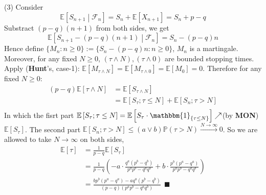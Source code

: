 \documentclass[a4paper,12pt,twoside]{book}
\begin{document}
\begin{itemize}
\begin{itemize}
	(3) Consider
	\begin{equation}
		\mathbb{E}\left[S_{n+1}\middle|\mathcal{F}_n\right] = S_n + \mathbb{E}\left[X_{n+1}\right] = S_n + p - q
	\end{equation}
	Substract $(p-q)(n+1)$ from both sides, we get
	\begin{equation}
		\mathbb{E}\left[S_{n+1}-(p-q)(n+1)\middle|\mathcal{F}_n\right] = S_n - (p-q)n
	\end{equation}
	Hence define $\{M_n: n\geq 0\}:=\{S_n-(p-q)n: n\geq 0\}$, $M_n$ is a martingale. \newline
	Moreover, for any fixed $N\geq 0$, $(\tau \wedge N), (\tau \wedge 0)$ are bounded stopping times. Apply (\textbf{Hunt}'s, case-1): $\mathbb{E}\left[M_{\tau \wedge N}\right]=\mathbb{E}\left[M_{\tau \wedge 0}\right]=\mathbb{E}\left[M_0\right]=0$. Therefore for any fixed $N\geq 0$:
	\begin{equation}
		\begin{split}
			(p-q)\mathbb{E}\left[\tau \wedge N\right] &= \mathbb{E}\left[S_{\tau \wedge N}\right]\\
			&= \mathbb{E}\left[S_{\tau}; \tau \leq N\right] + \mathbb{E}\left[S_n; \tau>N \right]\\
		\end{split}
	\end{equation}
	In which the fisrt part $\mathbb{E}\left[S_{\tau}; \tau \leq N\right] = \mathbb{E}\left[S_{\tau}\cdot \mathbbm{1}_{\{\tau\leq N\}}\right]\nearrow$(by \textbf{MON}) $\mathbb{E}\left[S_{\tau}\right]$. \newline
	The second part $\mathbb{E}\left[S_n; \tau>N\right]\leq (a \vee b)\mathbb{P}\left(\tau>N\right)\xrightarrow{N\to \infty}0$. \newline
	So we are allowed to take $N\to \infty$ on both sides, 
	\begin{equation}
		\begin{split}
			\mathbb{E}\left[\tau \right] &= \frac{1}{p-q}\mathbb{E}\left[S_{\tau}\right]\\
			&= \frac{1}{p-q}\left(-a\cdot  \frac{q^a(p^b-q^b)}{p^ap^b - q^a q^b}+b\cdot  \frac{p^b(p^a-q^a)}{p^ap^b - q^a q^b}\right)\\
			&= \frac{bp^b(p^a-q^a)-aq^a(p^b-q^b)}{(p-q)(p^ap^b - q^a q^b)}~~\blacksquare
		\end{split}
	\end{equation}


\end{itemize}
\end{itemize}
\end{document}

